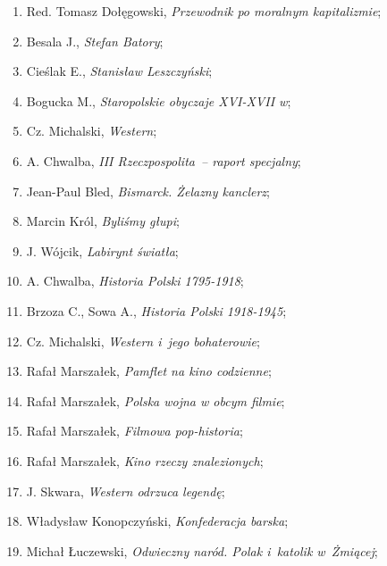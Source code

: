 \documentclass[a4paper,11pt]{article}
\begin{document}
\begin{enumerate}
\item Red. Tomasz Dołęgowski, \textit{Przewodnik po moralnym
    kapitalizmie};

\item Besala J., \textit{Stefan Batory};

\item Cieślak E., \textit{Stanisław Leszczyński};

\item Bogucka M., \textit{Staropolskie obyczaje XVI-XVII w};

\item Cz. Michalski, \textit{Western};

\item A. Chwalba, \textit{III Rzeczpospolita~-- raport specjalny};

\item Jean-Paul Bled, \textit{Bismarck. Żelazny kanclerz};

\item Marcin Król, \textit{Byliśmy głupi};

\item J. Wójcik, \textit{Labirynt światła};

\item A. Chwalba, \textit{Historia Polski 1795-1918};

\item Brzoza C., Sowa A., \textit{Historia Polski 1918-1945};

\item Cz. Michalski, \textit{Western i~jego bohaterowie};

\item Rafał Marszałek, \textit{Pamflet na kino codzienne};

\item Rafał Marszałek, \textit{Polska wojna w obcym filmie};

\item Rafał Marszałek, \textit{Filmowa pop-historia};

\item Rafał Marszałek, \textit{Kino rzeczy znalezionych};

\item J. Skwara, \textit{Western odrzuca legendę};

\item Władysław Konopczyński, \textit{Konfederacja barska};

\item Michał Łuczewski, \textit{Odwieczny naród. Polak i~katolik
    w~Żmiącej};


\end{enumerate}
\end{document}
